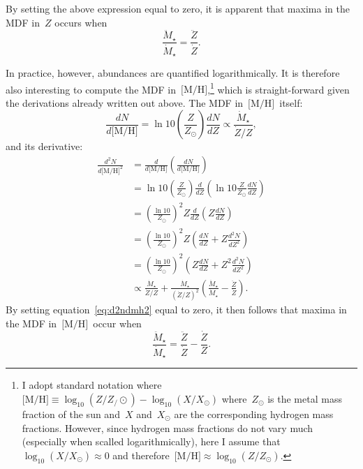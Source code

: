\documentclass[12pt]{article}
\newcommand{\mh}{\ensuremath{\text{[M/H]}}}
\begin{document}
By setting the above expression equal to zero, it is apparent that maxima in the
MDF in~$Z$ occurs when
\begin{equation}
\frac{\ddot{M}_\star}{\dot{M}_\star} = \frac{\ddot{Z}}{\dot{Z}}.
\label{eq:zmdf_maxima_criterion}
\end{equation}
\par
In practice, however, abundances are quantified logarithmically.
It is therefore also interesting to compute the MDF in~\mh,\footnote{
	I adopt standard notation where~$\mh \equiv \log_{10}(Z / Z_/\odot) -
	\log_{10}(X / X_\odot)$ where~$Z_\odot$ is the metal mass fraction of the
	sun and~$X$ and~$X_\odot$ are the corresponding hydrogen mass fractions.
	However, since hydrogen mass fractions do not vary much (especially when
	scalled logarithmically), here I assume that~$\log_{10}(X / X_\odot)
	\approx 0$ and therefore~$\mh \approx \log_{10}(Z / Z_\odot)$.
} which is straight-forward given the derivations already written out above.
The MDF in~\mh~itself:
\begin{equation}
\frac{dN}{d\mh} = \ln 10 \left(\frac{Z}{Z_\odot}\right) \frac{dN}{dZ}
\propto \frac{\dot{M}_\star}{\dot{Z} / Z},
\label{eq:dndmh}
\end{equation}
and its derivative:
\begin{subequations}\begin{align}
\frac{d^2N}{d\mh^2} &= \frac{d}{d\mh} \left(\frac{dN}{d\mh}\right)
\\
&= \ln 10 \left(\frac{Z}{Z_\odot}\right) \frac{d}{dZ}
\left(\ln 10 \frac{Z}{Z_\odot} \frac{dN}{dZ}\right)
\\
&= \left(\frac{\ln 10}{Z_\odot}\right)^2 Z\frac{d}{dZ}
\left(Z\frac{dN}{dZ}\right)
\\
&= \left(\frac{\ln 10}{Z_\odot}\right)^2
Z\left(\frac{dN}{dZ} + Z\frac{d^2N}{dZ^2}\right)
\\
&= \left(\frac{\ln 10}{Z_\odot}\right)^2 \left(Z\frac{dN}{dZ} +
Z^2 \frac{d^2N}{dZ^2}\right)
\\
&\propto \frac{\dot{M}_\star}{\dot{Z} / Z} +
\frac{\dot{M}_\star}{(\dot{Z} / Z)^2}
\left(\frac{\ddot{M}_\star}{\dot{M}_\star} - \frac{\ddot{Z}}{\dot{Z}}\right).
\label{eq:d2ndmh2}
\end{align}\end{subequations}
By setting equation~\ref{eq:d2ndmh2} equal to zero, it then follows that maxima
in the MDF in~\mh~occur when
\begin{equation}
\frac{\ddot{M}_\star}{\dot{M}_\star} = \frac{\ddot{Z}}{\dot{Z}} -
\frac{\dot{Z}}{Z}.
\label{eq:mhmdf_maxima_criterion}
\end{equation}
\end{document}
